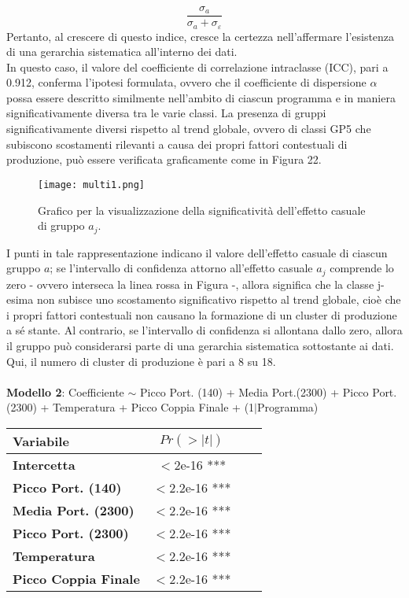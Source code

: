 \documentclass[fleqn,10pt]{SelfArx} %
\begin{document}
\begin{equation}
    \frac{\sigma_a}{\sigma_a+\sigma_{\varepsilon}}
\end{equation}
Pertanto, al crescere di questo indice, cresce la certezza nell'affermare l'esistenza di una gerarchia sistematica all'interno dei dati.\\
In questo caso, il valore del coefficiente di correlazione intraclasse (ICC), pari a 0.912, conferma l'ipotesi formulata, ovvero che il coefficiente di dispersione $\alpha$ possa essere descritto similmente nell'ambito di ciascun programma e in maniera significativamente diversa tra le varie classi. La presenza di gruppi significativamente diversi rispetto al trend globale, ovvero di classi GP5 che subiscono scostamenti rilevanti a causa dei propri fattori contestuali di produzione, può essere verificata graficamente come in Figura 22.
\begin{figure}[H]
    \centering
    \texttt{[image: multi1.png]}
    \label{fig:em}
    \caption{Grafico per la visualizzazione della significatività dell'effetto casuale di gruppo $a_j$.}
\end{figure}
I punti in tale rappresentazione indicano il valore dell'effetto casuale di ciascun gruppo $a$; se l'intervallo di confidenza attorno all'effetto casuale $a_j$ comprende lo zero - ovvero interseca la linea rossa in Figura -, allora significa che la classe j-esima non subisce uno scostamento significativo rispetto al trend globale, cioè che i propri fattori contestuali non causano la formazione di un cluster di produzione a sé stante. Al contrario, se l'intervallo di confidenza si allontana dallo zero, allora il gruppo può considerarsi parte di una gerarchia sistematica sottostante ai dati. Qui, il numero di cluster di produzione è pari a 8 su 18.\\
\\
\textbf{Modello 2}: Coefficiente $\sim$  Picco Port. (140) + Media Port.(2300) + Picco Port. (2300) + Temperatura + Picco Coppia Finale + (1$\mid$Programma)
{\begin{table}[h] 
\centering
\begin{tabular}[t]{lccc}
\toprule 
Variabile&$Pr(> |t|)$\\
\midrule 
\textbf{Intercetta}&$<$2e-16 ***&\\
\textbf{Picco Port. (140)}&$<$2.2e-16 ***\\ 
\textbf{Media Port. (2300)}&$<$2.2e-16 ***\\ 
\textbf{Picco Port. (2300)}&$<$2.2e-16 ***\\ 
\textbf{Temperatura}&$<$2.2e-16 ***\\
\textbf{Picco Coppia Finale}&$<$2.2e-16 ***\\
\bottomrule 
\end{tabular}
\end{table}}\\
\end{document}
